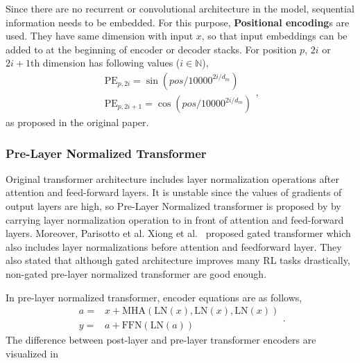 Since there are no recurrent or convolutional architecture in the model, sequential information needs to be embedded. 
For this purpose, \textbf{Positional encoding}s are used. 
They have same dimension with input $x$, so that input embeddings can be added to at the beginning of encoder or decoder stacks. 
For position $p$, $2i$ or $2i+1$th dimension has following values ($i \in \mathbb{N}$), 
\begin{equation}
\begin{split}
\mathrm{PE}_{p,2i} = \sin(pos/10000^{2i/d_m}) \\
\mathrm{PE}_{p,2i+1} = \cos(pos/10000^{2i/d_m})
\end{split},
\end{equation}
as proposed in the original paper. 

\subsubsection{Pre-Layer Normalized Transformer}

Original transformer architecture includes layer normalization operations after attention and feed-forward layers. 
It is unstable since the values of gradients of output layers are high, so Pre-Layer Normalized transformer is proposed by \cite{xiong_layer_2020} by carrying layer normalization operation to in front of attention and feed-forward layers. 
Moreover, Parisotto et al. Xiong et al.~ \cite{parisotto_stabilizing_2019} proposed gated transformer which also includes layer normalizations before attention and feedforward layer. 
They also stated that although gated architecture improves many RL tasks drastically, non-gated pre-layer normalized transformer are good enough. 

In pre-layer normalized transformer, encoder equations are as follows,
\begin{equation}
\begin{split}
a = & x+ \mathrm{MHA}(\mathrm{LN}(x),\mathrm{LN}(x),\mathrm{LN}(x)) \\
y = & a + \mathrm{FFN}(\mathrm{LN}(a))
\end{split}.
\end{equation}
The difference between post-layer and pre-layer transformer encoders are visualized in 

